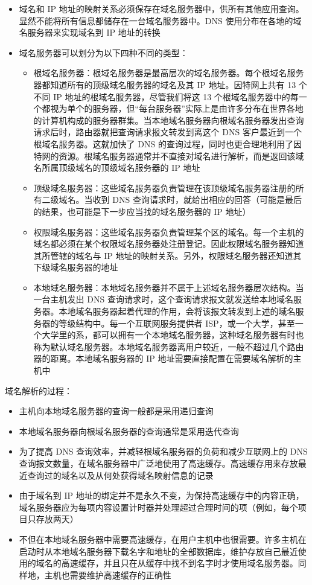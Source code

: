 \documentclass[cs4size,a4paper,10pt]{ctexart}
\begin{document}
	\begin{itemize}
		\item 域名和 IP 地址的映射关系必须保存在域名服务器中，供所有其他应用查询。显然不能将所有信息都储存在一台域名服务器中。DNS 使用分布在各地的域名服务器来实现域名到 IP 地址的转换
		\item 域名服务器可以划分为以下四种不同的类型：
		\begin{itemize}
			\item 根域名服务器：根域名服务器是最高层次的域名服务器。每个根域名服务器都知道所有的顶级域名服务器的域名及其 IP 地址。因特网上共有 13 个不同 IP 地址的根域名服务器，尽管我们将这 13 个根域名服务器中的每一个都视为单个的服务器，但“每台服务器”实际上是由许多分布在世界各地的计算机构成的服务器群集。当本地域名服务器向根域名服务器发出查询请求后时，路由器就把查询请求报文转发到离这个 DNS 客户最近到一个根域名服务器。这就加快了 DNS 的查询过程，同时也更合理地利用了因特网的资源。根域名服务器通常并不直接对域名进行解析，而是返回该域名所属顶级域名的顶级域名服务器的 IP 地址
			\item 顶级域名服务器：这些域名服务器负责管理在该顶级域名服务器注册的所有二级域名。当收到 DNS 查询请求时，就给出相应的回答（可能是最后的结果，也可能是下一步应当找的域名服务器的 IP 地址）
			\item 权限域名服务器：这些域名服务器负责管理某个区的域名。每一个主机的域名都必须在某个权限域名服务器处注册登记。因此权限域名服务器知道其所管辖的域名与 IP 地址的映射关系。另外，权限域名服务器还知道其下级域名服务器的地址
			\item 本地域名服务器：本地域名服务器并不属于上述域名服务器层次结构。当一台主机发出 DNS 查询请求时，这个查询请求报文就发送给本地域名服务器。本地域名服务器起着代理的作用，会将该报文转发到上述的域名服务器的等级结构中。每一个互联网服务提供者 ISP，或一个大学，甚至一个大学里的系，都可以拥有一个本地域名服务器，这种域名服务器有时也称为默认域名服务器。本地域名服务器离用户较近，一般不超过几个路由器的距离。本地域名服务器的 IP 地址需要直接配置在需要域名解析的主机中
		\end{itemize}
	\end{itemize}

	域名解析的过程：
	\begin{itemize}
		\item 主机向本地域名服务器的查询一般都是采用递归查询
		\item 本地域名服务器向根域名服务器的查询通常是采用迭代查询
		\item 为了提高 DNS 查询效率，并减轻根域名服务器的负荷和减少互联网上的 DNS 查询报文数量，在域名服务器中广泛地使用了高速缓存。高速缓存用来存放最近查询过的域名以及从何处获得域名映射信息的记录
		\item 由于域名到 IP 地址的绑定并不是永久不变，为保持高速缓存中的内容正确，域名服务器应为每项内容设置计时器并处理超过合理时间的项（例如，每个项目只存放两天）
		\item 不但在本地域名服务器中需要高速缓存，在用户主机中也很需要。许多主机在启动时从本地域名服务器下载名字和地址的全部数据库，维护存放自己最近使用的域名的高速缓存，并且只在从缓存中找不到名字时才使用域名服务器。同样地，主机也需要维护高速缓存的正确性
	\end{itemize}
\end{document}
